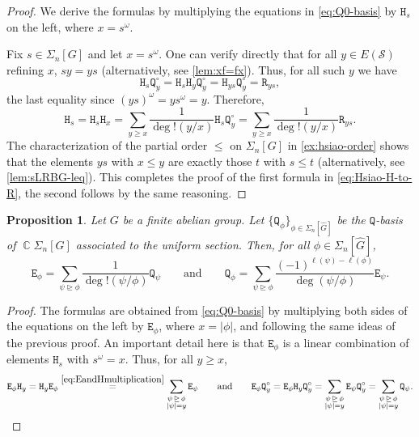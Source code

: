 \documentclass[11pt, oneside, reqno]{amsart}
\newtheorem{prop}[theorem]{Proposition}
\theoremstyle{definition}
\numberwithin{equation}{section}
\DeclareMathOperator{\C}{\mathbb{C}}
\def \SS{{\mathcal{S}}}
\def \kk{\C}
\def \wh{\widehat}
\def \gsetcomposition{{\Sigma_n[G]}}
\def \hsiao {{\gsetcomposition}}
\DeclareMathOperator{\chgeq}{\unrhd}
\def\qqand{\qquad\text{and}\qquad}
\newcommand{\B}[1]{\mathtt{#1}} 			%
\newcommand{\abs}[1]{|{#1}|} 				%
\begin{document}
\begin{proof}
    We derive the formulas by multiplying the equations in
    \cref{eq:Q0-basis} by $\B{H}_s$ on the left, where $x = s^\omega$.

    Fix $s \in \hsiao$ and let $x = s^\omega$.
    One can verify directly that for all $y \in E(\SS)$ refining $x$, $sy = ys$ (alternatively, see \cref{lem:xf=fx}).
    Thus, for all such $y$ we have
    \[
        \B{H}_s \B{Q}^\circ_y = \B{H}_s \B{H}_y \B{Q}^\circ_y = \B{H}_{ys} \B{Q}^\circ_y = \B{R}_{ys},
    \]
    the last equality since $(ys)^\omega = y s^\omega = y$.
    Therefore,
    \[
        \B{H}_s = \B{H}_s \B{H}_x = \sum_{y \geq x} \dfrac{1}{\deg!(y/x)} \B{H}_s \B{Q}^\circ_y = \sum_{y \geq x} \dfrac{1}{\deg!(y/x)} \B{R}_{ys}.
    \]
    The characterization of the partial order $\leq$ on $\hsiao$ in \cref{ex:hsiao-order} shows that the elements $ys$ with $x \leq y$ are exactly those $t$ with $s \leq t$ (alternatively, see \cref{lem:sLRBG-leq}).
    This completes the proof of the first formula in \cref{eq:Hsiao-H-to-R}, the second follows by the same reasoning.
\end{proof}

\begin{prop}
    Let $G$ be a finite abelian group. Let $\{\B{Q}_\phi\}_{\phi \in \Sigma_n[\wh{G}]}$ be the $\B{Q}$-basis of $\kk \hsiao$ associated to the uniform section.
    Then, for all $\phi \in \Sigma_n[\wh{G}]$,
    \begin{equation}\label{eq:Hsiao-E-to-Q}
        \B{E}_\phi =
            \sum_{\psi \chgeq \phi} \dfrac{1}{\deg!(\psi/\phi)} \B{Q}_\psi
        \qqand
        \B{Q}_\phi =
            \sum_{\psi \chgeq \phi} \dfrac{(-1)^{\ell(\psi) - \ell(\phi)}}{\deg(\psi/\phi)} \B{E}_\psi.
    \end{equation}
\end{prop}

\begin{proof}
    The formulas are obtained from \cref{eq:Q0-basis} by multiplying both sides of the equations on the left by $\B{E}_\phi$, where $x = \abs{\phi}$,
    and following the same ideas of the previous proof. An important detail here is that $\B{E}_\phi$ is a linear combination of elements $\B{H}_s$ with $s^\omega = x$.
    Thus, for all $y \geq x$, 
    \[
        \B{E}_\phi \B{H}_y          =
        \B{H}_y \B{E}_\phi          \overset{\cref{eq:EandHmultiplication}}{=}
        \sum_{ \substack{ \psi \chgeq \phi \\ \abs{\psi} = y } } \B{E}_\psi
        \qqand
        \B{E}_\phi \B{Q}^\circ_y          =
        \B{E}_\phi \B{H}_y\B{Q}^\circ_y          =
        \sum_{ \substack{ \psi \chgeq \phi \\ \abs{\psi} = y } } \B{E}_\psi \B{Q}^\circ_y =
        \sum_{ \substack{ \psi \chgeq \phi \\ \abs{\psi} = y } } \B{Q}_\psi. \qedhere
    \]
\end{proof}
\end{document}
